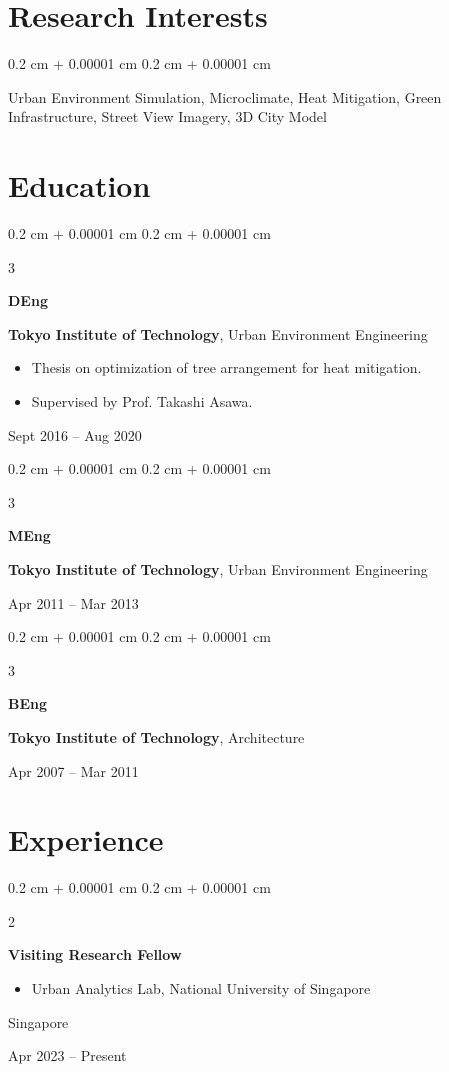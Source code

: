 \documentclass[10pt, letterpaper]{article}
\newenvironment{highlights}{
    \begin{itemize}[
        topsep=0.10 cm,
        parsep=0.10 cm,
        partopsep=0pt,
        itemsep=0pt,
        leftmargin=0.4 cm + 10pt
    ]
}{
    \end{itemize}
} %
\newenvironment{onecolentry}{
    \begin{adjustwidth}{
        0.2 cm + 0.00001 cm
    }{
        0.2 cm + 0.00001 cm
    }
}{
    \end{adjustwidth}
} %
\newenvironment{twocolentry}[2][]{
    \onecolentry
    \def\secondColumn{#2}
    \setcolumnwidth{\fill, 4.5 cm}
    \begin{paracol}{2}
}{
    \switchcolumn \raggedleft \secondColumn
    \end{paracol}
    \endonecolentry
} %
\newenvironment{threecolentry}[3][]{
    \onecolentry
    \def\thirdColumn{#3}
    \setcolumnwidth{1 cm, \fill, 4.5 cm}
    \begin{paracol}{3}
    {\raggedright #2} \switchcolumn
}{
    \switchcolumn \raggedleft \thirdColumn
    \end{paracol}
    \endonecolentry
} %
\begin{document}
    \section{Research Interests}

    \begin{onecolentry}
        Urban Environment Simulation, Microclimate, Heat Mitigation, Green Infrastructure, Street View Imagery, 3D City Model
    \end{onecolentry}
    
    \section{Education}

    \begin{threecolentry}{\textbf{DEng}}{
        Sept 2016 – Aug 2020
    }
        \textbf{Tokyo Institute of Technology}, Urban Environment Engineering
        \begin{highlights}
            \item Thesis on optimization of tree arrangement for heat mitigation.
            \item Supervised by Prof. Takashi Asawa.
        \end{highlights}
    \end{threecolentry}

    \begin{threecolentry}{\textbf{MEng}}{
        Apr 2011 – Mar 2013
    }
        \textbf{Tokyo Institute of Technology}, Urban Environment Engineering
    \end{threecolentry}

    \begin{threecolentry}{\textbf{BEng}}{
        Apr 2007 – Mar 2011
    }
        \textbf{Tokyo Institute of Technology}, Architecture
    \end{threecolentry}
    
    \section{Experience}

    \begin{twocolentry}{
        Singapore

        Apr 2023 – Present
    }
        \textbf{Visiting Research Fellow}
        \begin{highlights}
            \item Urban Analytics Lab, National University of Singapore
        \end{highlights}
    \end{twocolentry}
\end{document}
